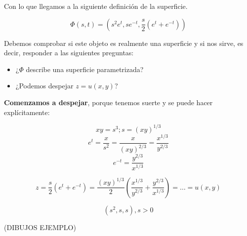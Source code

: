 \begin{example}{1}
		Con lo que llegamos a la siguiente definición de la superficie.

		$$ \Phi(s,t) = (s^2e^t, se^{-t}, \frac{s}{2}(e^t + e^{-t}))$$

		Debemos comprobar si este objeto es realmente una superficie y si nos sirve, es decir, responder a las siguientes preguntas:

		\begin{itemize}
			\item ¿$\Phi$ describe una superficie parametrizada?
			\item ¿Podemos despejar $z=u(x,y)$?
		\end{itemize}

		\textbf{Comenzamos a despejar}, porque tenemos suerte y se puede hacer explícitamente:

		$$xy = s^3; s=(xy)^{1/3}$$
		$$e^t = \frac{x}{s^2} = \frac{x}{(xy)^{2/3}} = \frac{x^{1/3}}{y^{2/3}}$$
		$$e^{-t} = \frac{y^{2/3}}{x^{1/3}}$$

		$$z = \frac{s}{2}(e^{t}+e^{-t}) = \frac{(xy)^{1/3}}{2} (\frac{x^{1/3}}{y^{2/3}}+\frac{y^{2/3}}{x^{1/3}}) = … = u(x,y) $$

		$$(s^2,s,s), s > 0$$

		(DIBUJOS EJEMPLO)

	\end{example}

